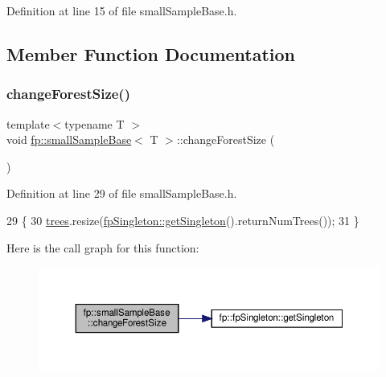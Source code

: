 Definition at line 15 of file small\+Sample\+Base.\+h.



\subsection{Member Function Documentation}
\mbox{\label{classfp_1_1smallSampleBase_a92cbc7c3e09718ebe0704fbb16e44653}} 
\subsubsection{\texorpdfstring{change\+Forest\+Size()}{changeForestSize()}}
{\footnotesize\ttfamily template$<$typename T $>$ \\
void \hyperlink{classfp_1_1smallSampleBase}{fp\+::small\+Sample\+Base}$<$ T $>$\+::change\+Forest\+Size (\begin{DoxyParamCaption}{ }\end{DoxyParamCaption})\hspace{0.3cm}{\ttfamily [inline]}}



Definition at line 29 of file small\+Sample\+Base.\+h.


\begin{DoxyCode}
29                                    \{
30                 \hyperlink{classfp_1_1smallSampleBase_a9a3d92948248f1809d9f025b553512b6}{trees}.resize(\hyperlink{classfp_1_1fpSingleton_a8bdae77b68521003e3fc630edec2e240}{fpSingleton::getSingleton}().returnNumTrees());
31             \}
\end{DoxyCode}
Here is the call graph for this function\+:\nopagebreak
\begin{figure}[H]
\begin{center}
\leavevmode
\includegraphics[width=350pt]{classfp_1_1smallSampleBase_a92cbc7c3e09718ebe0704fbb16e44653_cgraph}
\end{center}
\end{figure}
\mbox{\label{classfp_1_1smallSampleBase_a2078ad4ad755e11dcb3d05e9e902bd70}} 
